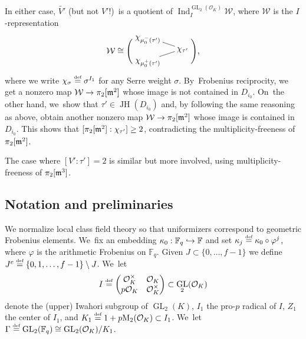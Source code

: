 \documentclass[JEP,XML,SOM,Unicode,NoFloatCountersInSection, NoEqCountersInSection,published]{cedram}
\newcommand\hto{\mathrel{\lhook\joinrel\to}}
\let\wt\widetilde
\newcommand{\defeq}{\stackrel{\textrm{\tiny{\upshape{def}}}}{=}}
\newcommand{\F}{\mathbb{F}}
\newcommand{\cO}{\mathcal{O}}
\newcommand{\cW}{\mathcal{W}}
\DeclareMathOperator{\GL}{GL}
\DeclareMathOperator{\Ind}{Ind}
\DeclareMathOperator{\JH}{\mathrm{JH}}
\theoremstyle{plain}
\theoremstyle{definition}
\begin{document}
In either case, $\wt{V'}$ (but not $V'$!)\ is a quotient of $\Ind_I^{\GL_2(\cO_K)} \cW$, where $\cW$ is the $I$-representation
\begin{equation*}
\cW \cong \Biggl( \vcenter{\xymatrix@R-2pc@C-0.85pc{
\chi_{\mu_0^-(\tau')} \ar@{-}[rd]\\
& \chi_{\tau'} \\
\chi_{\mu_0^+(\tau')} \ar@{-}[ru]}}
\Biggr),
\end{equation*}
where we write $\chi_\sigma \defeq \sigma^{I_1}$ for any Serre weight $\sigma$. By~Frobenius reciprocity, we get a nonzero map $\cW \to \pi_2[\m^2]$ whose image is not contained in $D_{i_0}$. On~the other hand, we~show that $\tau' \in \JH(D_{i_0})$ and, by following the same reasoning as above, obtain another nonzero map $\cW \to \pi_2[\m^2]$ whose image is contained in $D_{i_0}$.
This shows that $[\pi_2[\mathfrak{m}^2]:\chi_{\tau'}] \ge 2$, contradicting the multiplicity-freeness of $\pi_2[\mathfrak{m}^2]$.

The case where $[V':\tau'] = 2$ is similar but more involved, using multiplicity-freeness of $\pi_2[\mathfrak{m}^3]$.

\subsection{Notation and preliminaries}
\label{sec:notation}
\label{sec:preliminaries}

We normalize local class field theory so that uniformizers correspond to geometric Frobenius elements. We~fix an embedding \hbox{$\kappa_0:\F_q\hto \F$} and set $\kappa_j\defeq \kappa_0\circ\varphi^j$, where $\varphi$ is the arithmetic Frobenius on $\F_q$. Given $J\subset\{0,\dots,f-1\}$ we define $J^c\defeq \{0,1,\dots,f-1\} \setminus J$. We~let
\[
I\defeq \begin{pmatrix}\cO_K^\times&\cO_K\\p\cO_K&\cO_K^\times\end{pmatrix} \subset \GL_2(\cO_K)
\]
denote the (upper) Iwahori subgroup of $\GL_2(K)$, $I_1$ the pro-$p$ radical of $I$, $Z_1$ the center of $I_1$, and $K_1\defeq 1+p{\rm M}_2(\cO_K)\subset I_1$. We~let $\Gamma\defeq \GL_2(\F_q)\cong \GL_2(\cO_K)/K_1$.
\end{document}
